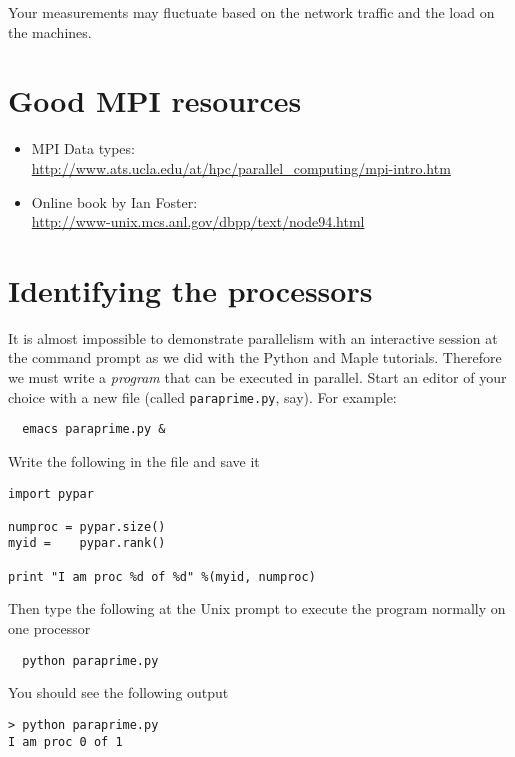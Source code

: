 \documentclass[12pt]{article}
\begin{document}
Your measurements may fluctuate based on the network traffic and the
load on the machines.


\section*{Good MPI resources}
\begin{itemize}
  \item MPI Data types:\\
    \url{http://www.ats.ucla.edu/at/hpc/parallel_computing/mpi-intro.htm}
  \item Online book by Ian Foster:\\
    \url{http://www-unix.mcs.anl.gov/dbpp/text/node94.html}
\end{itemize}





\section{Identifying the processors}




It is almost impossible to demonstrate parallelism with an interactive
session at the command prompt as we did with the Python and Maple tutorials.
Therefore we must write a \emph{program} that can be executed in parallel.
Start an editor of your choice with a new file
(called \texttt{paraprime.py}, say). For example:
\begin{verbatim}
  emacs paraprime.py &
\end{verbatim}

\noindent Write the following in the file and save it
{\small \begin{verbatim}
import pypar

numproc = pypar.size()
myid =    pypar.rank()

print "I am proc %d of %d" %(myid, numproc)
\end{verbatim}}

Then type the following at the Unix prompt to execute the
program normally on one processor
{\small \begin{verbatim}
  python paraprime.py
\end{verbatim}}
\noindent You should see the following output
{\small \begin{verbatim}
> python paraprime.py
I am proc 0 of 1
\end{verbatim}}
\end{document}

